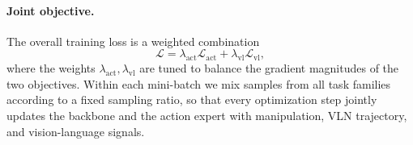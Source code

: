 \paragraph{Joint objective.}
The overall training loss is a weighted combination
\begin{equation}
\mathcal{L} = \lambda_{\text{act}} \mathcal{L}_{\text{act}} + \lambda_{\text{vl}} \mathcal{L}_{\text{vl}},
\end{equation}
where the weights $\lambda_{\text{act}}, \lambda_{\text{vl}}$ are tuned to balance the gradient magnitudes of the two objectives. Within each mini-batch we mix samples from all task families according to a fixed sampling ratio, so that every optimization step jointly updates the backbone and the action expert with manipulation, VLN trajectory, and vision-language signals.
